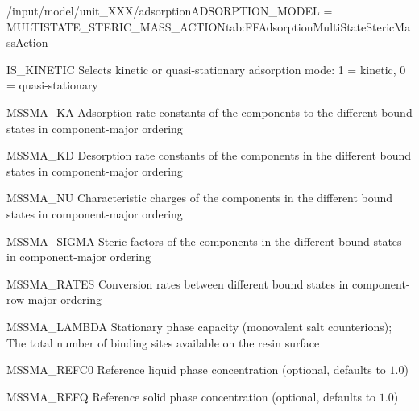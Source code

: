 \begin{condsubgroup}{/input/model/unit\_XXX/adsorption}{ADSORPTION\_MODEL = MULTISTATE\_STERIC\_MASS\_ACTION}{tab:FFAdsorptionMultiStateStericMassAction}
\begin{dataset}[type=int,range={$\{ 0,1 \}$},length=1]{IS\_KINETIC}
    Selects kinetic or quasi-stationary adsorption mode: 1 = kinetic, 0 = quasi-stationary
  \end{dataset}
  \begin{dataset}[unit=\si{\raiseto{3}\metre\of{MP}\per\raiseto{3}\metre\of{SP}\per\second}, type = double, range={$\geq 0$}, length={\texttt{NTOTALBND}}]{MSSMA\_KA} 
    Adsorption rate constants of the components to the different bound states in component-major ordering
  \end{dataset} 
  \begin{dataset}[unit=\si{\per\second} , type = double, range={$\geq 0$}, length={\texttt{NTOTALBND}}]{MSSMA\_KD} 
    Desorption rate constants of the components in the different bound states in component-major ordering
  \end{dataset} 
  \begin{dataset}[type = double, range={$\geq 0$}, length={\texttt{NTOTALBND}}]{MSSMA\_NU} 
    Characteristic charges of the components in the different bound states in component-major ordering
  \end{dataset} 
  \begin{dataset}[type = double, range={$\geq 0$}, length={\texttt{NTOTALBND}}]{MSSMA\_SIGMA} 
    Steric factors of the components in the different bound states in component-major ordering
  \end{dataset} 
  \begin{dataset}[unit=\si{\per\second}, type = double, range={$\geq 0$}, length={$\sum_{i=0}^{\texttt{NCOMP} - 1} \texttt{NBND}_i^2$}]{MSSMA\_RATES} 
    Conversion rates between different bound states in component-row-major ordering 
  \end{dataset}
  \begin{dataset}[unit=\si{\mol\per\cubic\metre\of{SP}}, type = double, range={$\geq 0$}, length={1}]{MSSMA\_LAMBDA} 
    Stationary phase capacity (monovalent salt counterions); The total number of binding sites available on the resin surface 
  \end{dataset}
  \begin{dataset}[unit=\si{\mol\per\raiseto{3}\metre\of{MP}}, type = double, range={$> 0$}, length={1}]{MSSMA\_REFC0} 
    Reference liquid phase concentration (optional, defaults to $1.0$) 
  \end{dataset} 
  \begin{dataset}[unit=\si{\mol\per\raiseto{3}\metre\of{SP}}, type = double, range={$> 0$}, length={1}]{MSSMA\_REFQ} 
    Reference solid phase concentration (optional, defaults to $1.0$)
  \end{dataset} 
\end{condsubgroup}

